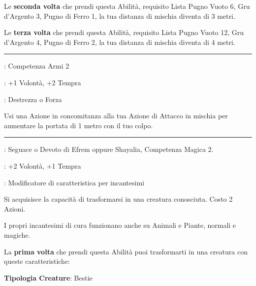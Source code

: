 \begin{multicols}{2}
Le \textbf{seconda volta} che prendi questa Abilità, requisito Lista Pugno Vuoto 6, Gru d'Argento 3, Pugno di Ferro 1, la tua distanza di mischia diventa di 3 metri.

Le \textbf{terza volta} che prendi questa Abilità, requisito Lista Pugno Vuoto 12, Gru d'Argento 4, Pugno di Ferro 2, la tua distanza di mischia diventa di 4 metri.


\smallskip\noindent\rule{\linewidth}{2pt} \hypertarget{Allungo}{}\medskip{}
\noindent
\begin{description}[noitemsep, topsep=0pt, parsep=0pt, partopsep=0pt, leftmargin=0cm, labelwidth=2.5cm]
    \item[\textbf{Requisito}]: Competenza Armi 2
    \item[\textbf{Tiri Salvezza}]: +1 Volontà, +2 Tempra
    \item[\textbf{Caratteristica}]: Destrezza o Forza
\end{description}

Usi una Azione in concomitanza alla tua Azione di Attacco in mischia per aumentare la portata di 1 metro con il tuo colpo.

\smallskip\noindent\rule{\linewidth}{2pt} \hypertarget{Animalia}{}\medskip{}
\noindent
\begin{description}[noitemsep, topsep=0pt, parsep=0pt, partopsep=0pt, leftmargin=0cm, labelwidth=2.5cm]
    \item[\textbf{Requisito}]: Seguace o Devoto di Efrem oppure Shayalia, Competenza Magica 2.
    \item[\textbf{Tiri Salvezza}]: +2 Volontà, +1 Tempra
    \item[\textbf{Caratteristica}]: Modificatore di caratteristica per incantesimi
\end{description}

Si acquisisce la capacità di trasformarsi in una creatura conosciuta. Costo 2 Azioni.

I propri incantesimi di cura funzionano anche su Animali e Piante, normali e magiche.

\medskip

La \textbf{prima volta} che prendi questa Abilità puoi trasformarti in una creatura con queste caratteristiche:

\medskip

\textbf{Tipologia Creature}: Bestie


\end{multicols}
